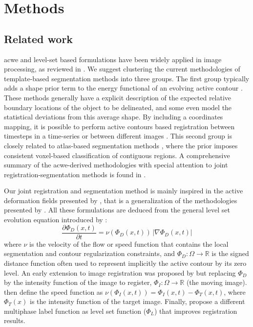 \section{Methods}
\label{sec:methods}
%
\subsection{Related work}
\label{sec:methods_background}

\Gls{acwe} and level-set based formulations have been widely applied in image
processing, as reviewed in \citep{suri_shape_2002}. We suggest clustering the 
current methodologies of template-based segmentation methods into three groups. 
The first group typically adds a shape prior term to the energy functional of 
an evolving active contour \citep{bresson_variational_2006,
chan_level_2005,chen_using_2002,cremers_kernel_2006,gastaud_combining_2004}.
These methods generally have a explicit description of the expected relative boundary 
locations of the object to be delineated, and some even model the statistical deviations
from this average shape. By including a coordinates mapping, it is possible to perform
active contours based registration between timesteps in a time-series or between different
images \citep{wyatt_map_2003,paragios_level_2003,vemuri_joint_2003,yezzi_variational_2003}.
This second group is closely related to atlas-based segmentation methods 
\citep{gorthi_segmentation_2009,gorthi_active_2011,pohl_unifying_2005,
pohl_bayesian_2006,wang_joint_2006}, where the prior 
imposes consistent voxel-based classification of contiguous regions.
A comprehensive summary of the \gls{acwe}-derived methodologies with special attention
to joint registration-segmentation methods is found in \citep{gorthi_active_2011}.

Our joint registration and segmentation method is mainly inspired in the active
deformation fields presented by \citep{gorthi_active_2011}, that is a generalization
of the methodologies presented by \citep{bertalmio_morphing_2000,vemuri_joint_2003,
yezzi_variational_2003}.
All these formulations are deduced from the general level set evolution equation
introduced by \citep{osher_fronts_1988}:
\begin{equation}
\frac{\partial \Phi_D(x,t)}{\partial t} = \nu ( \Phi_D(x,t)) \, \left| \nabla \Phi_D(x,t) \right|
\end{equation}
where $\nu$ is the velocity of the flow or speed function that contains the local
segmentation and contour regularization constraints, and $\Phi_D: \Omega \to \mathbb{R}$
is the signed distance function often used to represent implicitly the active contour
by its zero level. An early extension to image registration was proposed by 
\citep{vemuri_joint_2003} but replacing $\Phi_D$ by the intensity function of the
image to register, $\Phi_I: \Omega \to \mathbb{R}$ (the moving image). 
\citep{bertalmio_morphing_2000,vemuri_joint_2003} then define the speed function as
$\nu(\Phi_I(x,t)) = \Phi_I(x,t) - \Phi_T(x,t)$, where $\Phi_T(x)$ is the intensity
function of the target image. Finally, \citep{gorthi_active_2011} propose a different
multiphase label function as level set function ($\Phi_L$) that improves registration
results.


